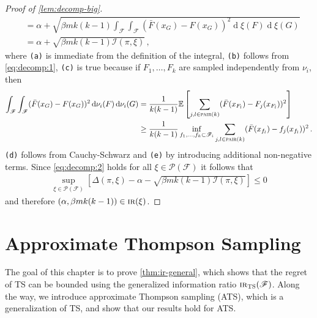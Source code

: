 \documentclass[letter, 12pt]{report}
\newcommand{\pair}{\operatorname{\textsc{pair}}}
\newcommand{\E}{\mathbb E}
\newcommand{\sF}{\mathscr F}
\newcommand{\sP}{\mathscr P}
\renewcommand{\d}[1]{\operatorname{d}\!#1}
\newcommand{\I}{\mathcal{I}}
\newcommand{\1}{\mathbf{1}}
\newcommand{\IR}{\operatorname{\textsc{ir}}}
\newcommand{\ts}{\textsc{TS}\xspace}
\newcommand{\ats}{\textsc{ATS}}
\theoremstyle{plain}
\theoremstyle{definition}
\theoremstyle{remark}
\begin{document}
\begin{proof}[Proof of \cref{lem:decomp-big}]
\begin{align}
         & = \alpha + \sqrt{\beta m k(k-1) \int_\sF \int_\sF (\bar F(x_G) - F(x_G))^2 \d{\xi}(F) \d{\xi}(G)} \nonumber                                                              \\
         & = \alpha + \sqrt{\beta m k(k-1) \I(\pi, \xi)} \,, \label{eq:decomp:2}
    \end{align}
    where \texttt{(a)} is immediate from the definition of the integral,
    \texttt{(b)} follows from \cref{eq:decomp:1},
    \texttt{(c)} is true because if $F_1,\ldots,F_k$ are sampled independently from $\nu_i$, then
    \begin{align*}
        \int_\sF \int_\sF (\bar F(x_G) - F(x_G))^2 \d{\nu_i}(F) \d{\nu_i}(G)
         & =
        \frac{1}{k(k-1)} \E\left[\sum_{j,l \in \pair(k)} (\bar F(x_{F_l}) - F_j(x_{F_l}))^2 \right]                                 \\
         & \geq \frac{1}{k(k-1)} \inf_{f_1,\ldots,f_k \subset \sF_i} \sum_{j,l \in \pair(k)} (\bar F(x_{f_l}) - f_j(x_{f_l}))^2 \,.
    \end{align*}
    \texttt{(d)} follows from Cauchy-Schwarz and \texttt{(e)} by introducing additional non-negative terms.
    Since \cref{eq:decomp:2} holds for all $\xi \in \sP(\sF)$ it follows that
    \begin{align*}
        \sup_{\xi \in \sP(\sF)} \left[\Delta(\pi, \xi) - \alpha - \sqrt{\beta mk(k-1) \I(\pi, \xi)}\right] \leq 0
    \end{align*}
    and therefore $(\alpha, \beta mk(k-1)) \in \IR(\xi)$.
\end{proof}

\chapter{Approximate Thompson Sampling}\label{ch:ats}
The goal of this chapter is to prove \cref{thm:ir-general},
which shows that the regret of \ts{} can be bounded using the generalized information ratio $\IR_\ts(\sF)$.
Along the way, we introduce approximate Thompson sampling (\ats{}), which is a generalization of \ts{}, and show that our results hold for \ats{}.
\end{document}

